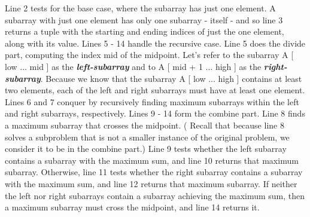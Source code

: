 Line 2 tests for the base case, where the subarray has just one element. A subarray with just one element has only one subarray - itself - and so line 3 returns a tuple with the starting and ending indices of just the one element, along with its value. Lines 5 - 14 handle the recursive case. Line 5 does the divide part, computing the index mid of the midpoint. Let’s refer to the subarray A [ low ... mid ] as the {\bfseries\itshape left-subarray} and to A [ mid + 1 ... high ] as the {\bfseries\itshape right-subarray}. Because we know that the subarray A [ low ... high ] contains at least two elements, each of the left and right subarrays must have at least one element. Lines 6 and 7 conquer by recursively finding maximum subarrays within the left and right subarrays, respectively. Lines 9 - 14 form the combine part. Line 8 finds a maximum subarray that crosses the midpoint. ( Recall that because line 8 solves a subproblem that is not a smaller instance of the original problem, we consider it to be in the combine part.) Line 9 tests whether the left subarray contains a subarray with the maximum sum, and line 10 returns that maximum subarray. Otherwise, line 11 tests whether the right subarray contains a subarray with the maximum sum, and line 12 returns that maximum subarray. If neither the left nor right subarrays contain a subarray achieving the maximum sum, then a maximum subarray must cross the midpoint, and line 14 returns it.

\pagebreak